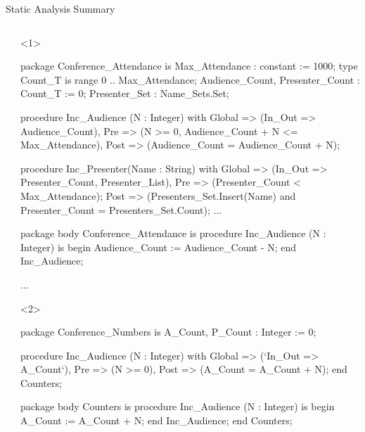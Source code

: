 \documentclass{beamer}
\begin{document}
\begin{frame}[fragile]{Static Analysis Summary}
\begin{columns}
\begin{column}{2cm}
    \end{column}

    \begin{column}{9cm}

      \begin{onlyenv}<1>
      \begin{pxcode}[language=SPARK,style=magic,gobble=8]
        package Conference_Attendance
        is
           Max_Attendance : constant := 1000;
           type Count_T is range 0 .. Max_Attendance;
           Audience_Count, Presenter_Count : Count_T := 0;
           Presenter_Set : Name_Sets.Set;

           procedure Inc_Audience (N : Integer)
           with Global => (In_Out => Audience_Count),
                Pre    => (N >= 0, Audience_Count + N <= Max_Attendance),
                Post   => (Audience_Count = Audience_Count + N);

           procedure Inc_Presenter(Name : String)
           with Global => (In_Out => Presenter_Count, Presenter_List),
                Pre    => (Presenter_Count < Max_Attendance);
                Post   => (Presenters_Set.Insert(Name) and 
                           Presenter_Count = Presenters_Set.Count);
           ...


        package body Conference_Attendance
        is
           procedure Inc_Audience (N : Integer)
           is
           begin
              Audience_Count := Audience_Count - N;
           end Inc_Audience;

           ...

      \end{pxcode}
      \end{onlyenv}

      \begin{onlyenv}<2>
      \begin{pxcode}[language=SPARK,style=magic,gobble=8]
        package Conference_Numbers
        is
           A_Count, P_Count : Integer := 0;

           procedure Inc_Audience (N : Integer)
           with Global => (`In_Out => A_Count`),
                Pre    => (N >= 0),
                Post   => (A_Count = A_Count + N);
        end Counters;

        package body Counters
        is
           procedure Inc_Audience (N : Integer)
           is
           begin
              A_Count := A_Count + N;
           end Inc_Audience;
        end Counters;
      \end{pxcode}
      \end{onlyenv}


\end{column}
\end{columns}
\end{frame}
\end{document}
